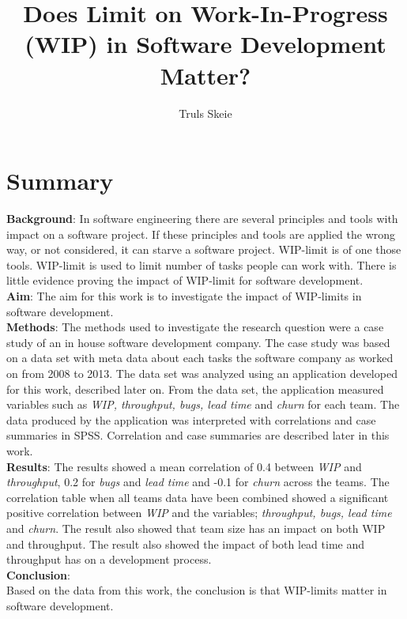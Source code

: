 \documentclass[UKenglish]{ifimaster}  %
\title{Does Limit on Work-In-Progress (WIP) in Software Development Matter?}        %
\author{Truls Skeie}                      %
\begin{document}
\ififorside{}
\frontmatter{}

\chapter*{Summary}                   %
\textbf{Background}: 
In software engineering there are several principles and tools with impact on a software project. If these principles and tools are applied the wrong way, or not considered, it can starve a software project. WIP-limit is of one those tools.  WIP-limit is used to limit number of tasks people can work with. There is little evidence proving the impact of WIP-limit for software development.\\
\textbf{Aim}: 
The aim for this work is to investigate the impact of WIP-limits in software development. \\
\textbf{Methods}:
The methods used to investigate the research question were a case study of an in house software development company. The case study was based on a data set with meta data about each tasks the software company as worked on from 2008 to 2013. The data set was analyzed using an application developed for this work, described later on. From the data set, the application measured variables such as \textit{WIP, throughput, bugs, lead time} and \textit{churn} for each team. The data produced by the application was interpreted with correlations and case summaries in SPSS. Correlation and case summaries are described later in this work.\\
\textbf{Results}: The results showed a mean correlation  of 0.4 between \textit{WIP} and \textit{throughput}, 0.2 for \textit{bugs} and \textit{lead time} and -0.1 for \textit{churn} across the teams.  The correlation table when all teams data have been combined showed a significant positive correlation  between \textit{WIP} and the variables; \textit{throughput, bugs, lead time} and \textit{churn}.  The result also showed that team size has an impact on both WIP and throughput. The result also showed the impact of both lead time and throughput has on a development process.\\ 
\textbf{Conclusion}:\\
Based on the data from this work, the conclusion is that WIP-limits matter in software development. 

\tableofcontents{}
\listoffigures{}
\listoftables{}
\lstlistoflistings{}
\end{document}
